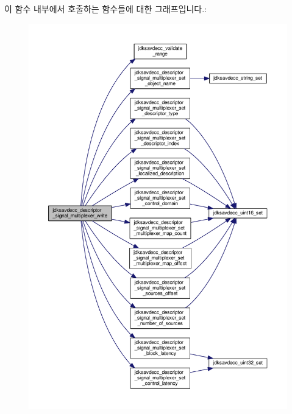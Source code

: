 이 함수 내부에서 호출하는 함수들에 대한 그래프입니다.\+:
\nopagebreak
\begin{figure}[H]
\begin{center}
\leavevmode
\includegraphics[width=350pt]{group__descriptor__signal__multiplexer_ga18625115a6367b05b3f993eabe654d78_cgraph}
\end{center}
\end{figure}



